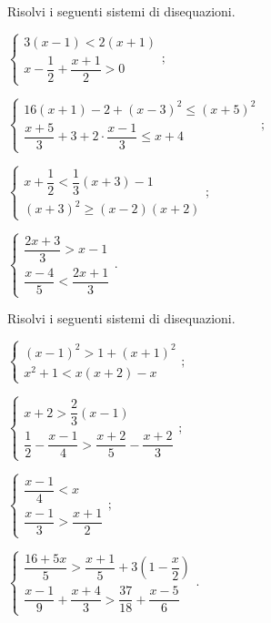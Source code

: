 \begin{esercizio}[\Ast]
 \label{ese:18.41}
 Risolvi i seguenti sistemi di disequazioni.
 \begin{multicols}{2}
 \begin{enumeratea}
 \item $\left\{\begin{array}{l}
	3(x-1)<2(x+1)\\
	x-\dfrac{1}{2}+\dfrac{x+1}{2}>0
	\end{array}\right.;$
\item {\longarray $\left\{\begin{array}{l}
	16(x+1)-2+(x-3)^{2}\le(x+5)^{2}\\
	\dfrac{x+5}{3}+3+2\cdot\dfrac{x-1}{3}\le x+4
	\end{array}\right.;$}
\item {\longarray $\left\{\begin{array}{l}
	x+\dfrac{1}{2}<\dfrac{1}{3}(x+3)-1\\
	(x+3)^{2}\ge (x-2)(x+2)
	\end{array}\right.;$}
\item {\longarray $\left\{\begin{array}{l}
	\dfrac{2x+3}{3}>x-1\\
	\dfrac{x-4}{5}<\dfrac{2x+1}{3}
	\end{array}\right..$}
\end{enumeratea}
\end{multicols}
\end{esercizio}

\begin{esercizio}[\Ast]
 \label{ese:18.42}
 Risolvi i seguenti sistemi di disequazioni.
 \begin{multicols}{2}
 \begin{enumeratea}
 \item $\left\{\begin{array}{l}
	(x-1)^{2}>1+(x+1)^{2}\\
	x^{2}+1<x(x+2)-x
	\end{array}\right.;$
\item {\longarray $\left\{\begin{array}{l}
	x+2>\dfrac{2}{3}(x-1)\\
	\dfrac{1}{2}-\dfrac{x-1}{4}>\dfrac{x+2}{5}-\dfrac{x+2}{3}
	\end{array}\right.;$}
\item {\longarray $\left\{\begin{array}{l}
	\dfrac{x-1}{4}<x\\
	\dfrac{x-1}{3}>\dfrac{x+1}{2}
	\end{array}\right.;$}
\item {\longarray $\left\{\begin{array}{l}
	\dfrac{16+5x}{5}>\dfrac{x+1}{5}+3\left(1-\dfrac{x}{2}\right)\\
	\dfrac{x-1}{9}+\dfrac{x+4}{3}>\dfrac{37}{18}+\dfrac{x-5}{6}
	\end{array}\right..$}
\end{enumeratea}
\end{multicols}
\end{esercizio}

